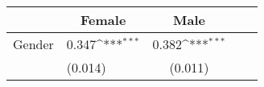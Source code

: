 {
\def\sym#1{\ifmmode^{#1}\else\(^{#1}\)\fi}
\begin{tabular*}{.4\hsize}{@{\hskip\tabcolsep\extracolsep\fill}l*{2}{lc}}
\toprule
                &\multicolumn{1}{c}{Female}&\multicolumn{1}{c}{Male}\\
\midrule
Gender          &    0.347\sym{***}&    0.382\sym{***}\\
                &  (0.014)         &  (0.011)         \\
\bottomrule
\end{tabular*}
}
